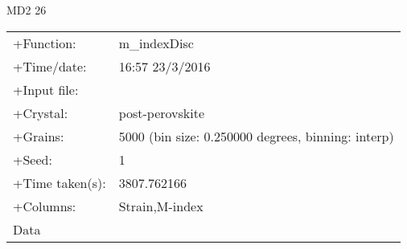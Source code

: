 \documentclass[a4paper,12pt,twoside]{report}
\numberwithin{equation}{chapter}
\begin{document}
\begin{texttt}
MD2\hspace{1cm}	     26\\
\begin{tabular}{l l}
+Function: & m\_indexDisc\\
+Time/date: &16:57 23/3/2016\\
+Input file: & \\    
+Crystal: & post-perovskite\\
+Grains:  & 5000 (bin size: 0.250000 degrees, binning: interp)\\
+Seed: & 1\\
+Time taken(s): &3807.762166\\
+Columns: &  Strain,M-index\\
Data &\\
\end{tabular}


\end{texttt}
\end{document}
